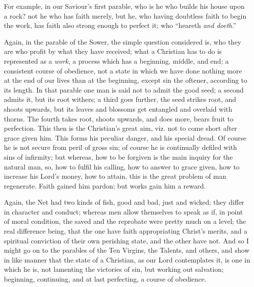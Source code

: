 For example, in our Saviour's first parable, who is he who builds
his house upon a rock? not he who has faith merely, but he, who having
doubtless faith to begin the work, has faith also strong enough to
perfect it; who ``heareth \emph{and doeth}.''

Again, in the parable of the Sower, the simple question considered
is, who they are who profit by what they have received; what a
Christian has to do is represented as a \emph{work}, a process which
has a beginning, middle, and end; a consistent course of obedience,
not a state in which we have done nothing more at the end of our lives
than at the beginning, except sin the oftener, according to its
length. In that parable one man is said not to admit the good seed; a
second admits it, but its root withers; a third goes further, the seed
strikes root, and shoots upwards, but its leaves and blossoms get
entangled and overlaid with thorns. The fourth takes root, shoots
upwards, and does more, bears fruit to perfection. This then is the
Christian's great aim, viz. not to come short after grace given him.
This forms his peculiar danger, and his special dread. Of course he is
not secure from peril of gross sin; of course he is continually
defiled with sins of infirmity; but whereas, how to be forgiven is the
main inquiry for the natural man, so, how to fulfil his calling, how
to answer to grace given, how to increase his Lord's money, how to
attain, this is the great problem of man regenerate. Faith gained him
pardon; but works gain him a reward.

Again, the Net had two kinds of fish, good and bad, just and
wicked; they differ in character and conduct; whereas men allow
themselves to speak as if, in point of moral condition, the saved and
the reprobate were pretty much on a level; the real difference being,
that the one have faith appropriating Christ's merits, and a spiritual
conviction of their own perishing state, and the other have not. And
so I might go on to the parables of the Ten Virgins, the Talents, and
others, and show in like manner that the state of a Christian, as our
Lord contemplates it, is one in which he is, not lamenting the
victories of sin, but working out salvation; beginning, continuing,
and at last perfecting, a course of obedience.

